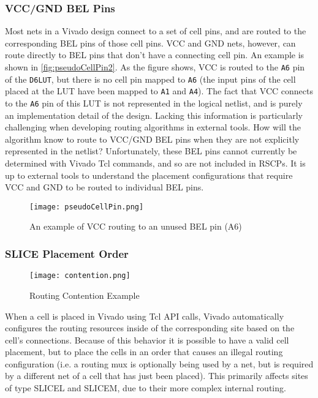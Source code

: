 \subsubsection{VCC/GND BEL Pins} \label{sec:vccGndBelPins}
Most nets in a Vivado design connect to a set of cell pins, and are routed to
the corresponding BEL pins of those cell pins. VCC and GND nets,
however, can route directly to BEL pins that don't have a connecting cell pin.
An example is shown in \autoref{fig:pseudoCellPin2}. As the figure shows, VCC is
routed to the \texttt{A6} pin of the \texttt{D6LUT}, but there is no cell pin
mapped to \texttt{A6} (the input pins of the cell placed at the LUT have
been mapped to \texttt{A1} and \texttt{A4}). The fact that VCC connects to the
\texttt{A6} pin of this LUT is not represented in the logical netlist, and is purely an
implementation detail of the design. Lacking this information is particularly
challenging when developing routing algorithms in external tools. How will the
algorithm know to route to VCC/GND BEL pins when they are not explicitly
represented in the netlist? Unfortunately, these BEL pins cannot currently be
determined with Vivado Tcl commands, and so are not included in RSCPs. It is up
to external tools to understand the placement configurations that require VCC
and GND to be routed to individual BEL pins.

\begin{figure}[t]
  \centering
  \texttt{[image: pseudoCellPin.png]}
  \caption{An example of VCC routing to an unused BEL pin (A6)}
  \label{fig:pseudoCellPin2}
\end{figure}

\subsubsection{SLICE Placement Order} \label{sec:slicePlacementOrder}

\begin{figure}[b!]
  \centering
  \texttt{[image: contention.png]}
  \caption{Routing Contention Example}
  \label{fig:contention}
\end{figure}

When a cell is placed in Vivado using Tcl API calls, Vivado
automatically configures the routing resources inside of the
corresponding site based on the cell's connections. Because
of this behavior it is possible to have a valid cell placement,
but to place the cells in an order that causes an illegal routing
configuration (i.e. a routing mux is optionally being used by
a net, but is required by a different net of a cell that has just
been placed). This primarily affects sites of type SLICEL
and SLICEM, due to their more complex internal routing. 

